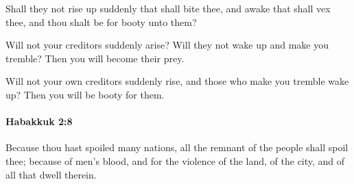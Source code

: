 			\begin{versebox}
					\item[BHS] 
					\item[LXX] 
					\item[ASV] Shall they not rise up suddenly that shall bite thee, and awake that shall vex thee, and thou shalt be for booty unto them?
					\item[NIV] Will not your creditors suddenly arise? Will they not wake up and make you tremble? Then you will become their prey.
					\item[NRSV] Will not your own creditors suddenly rise, and those who make you tremble wake up? Then you will be booty for them.
			\end{versebox}

		\paragraph{Habakkuk 2:8} %
			\label{HABAKKUK-2-8}

			Because thou hast spoiled many nations, all the remnant of the people shall spoil thee; because of men’s blood, and for the violence of the land, of the city, and of all that dwell therein.

